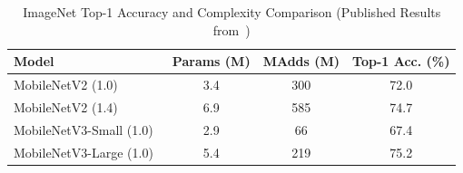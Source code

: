 \begin{table}[t]
\caption{ImageNet Top-1 Accuracy and Complexity Comparison (Published Results from~\cite{sandler2018mobilenetv2,howard2019mobilenetv3})}
\label{tab:comparison}
\centering
\begin{tabular}{lccc}
\toprule
Model & Params (M) & MAdds (M) & Top-1 Acc. (\%) \\
\midrule
MobileNetV2 (1.0)~\cite{sandler2018mobilenetv2} & 3.4 & 300 & 72.0 \\
MobileNetV2 (1.4)~\cite{sandler2018mobilenetv2} & 6.9 & 585 & 74.7 \\
MobileNetV3-Small (1.0)~\cite{howard2019mobilenetv3} & 2.9 & 66 & 67.4 \\
MobileNetV3-Large (1.0)~\cite{howard2019mobilenetv3} & 5.4 & 219 & 75.2 \\
\bottomrule
\end{tabular}
\end{table}
